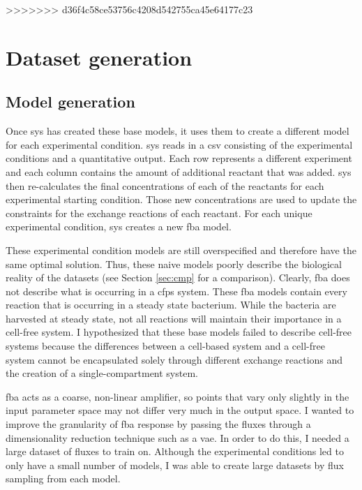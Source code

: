 >>>>>>> d36f4c58ce53756c4208d542755ca45e64177c23

\section{Dataset generation}

\subsection{Model generation}
Once \gls{sys} has created these base models, it uses them to create a different model for each experimental condition.
\gls{sys} reads in a \gls{csv} consisting of the experimental conditions and a quantitative output.
Each row represents a different experiment and each column contains the amount of additional reactant that was added.
\gls{sys} then re-calculates the final concentrations of each of the reactants for each experimental starting condition.
Those new concentrations are used to update the constraints for the exchange reactions of each reactant.
For each unique experimental condition, \gls{sys} creates a new \gls{fba} model.

These experimental condition models are still overspecified and therefore have the same optimal solution.
Thus, these naive models poorly describe the biological reality of the datasets (see Section \ref{sec:cmp} for a comparison).
Clearly, \gls{fba} does not describe what is occurring in a \gls{cfps} system.
These \gls{fba} models contain every reaction that is occurring in a steady state bacterium.
While the bacteria are harvested at steady state, not all reactions will maintain their importance in a cell-free system.
I hypothesized that these base models failed to describe cell-free systems because the differences between a cell-based system and a cell-free system cannot be encapsulated solely through different exchange reactions and the creation of a single-compartment system.

\gls{fba} acts as a coarse, non-linear amplifier, so points that vary only slightly in the input parameter space may not differ very much in the output space.
I wanted to improve the granularity of \gls{fba} response by passing the fluxes through a dimensionality reduction technique such as a \gls{vae}.
In order to do this, I needed a large dataset of fluxes to train on.
Although the experimental conditions led to only have a small number of models, I was able to create large datasets by flux sampling from each model.

